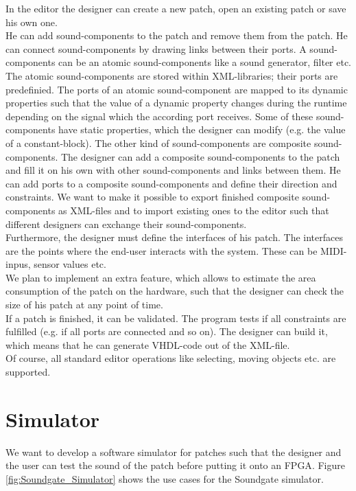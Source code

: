 In the editor the designer can create a new patch, open an existing patch or save his own one. \\
He can add sound-components to the patch and remove them from the patch. He can connect sound-components by drawing links between their ports. A sound-components can be an atomic sound-components like a sound generator, filter etc. The atomic sound-components are stored within XML-libraries; their ports are predefinied. The ports of an atomic sound-component are mapped to its dynamic properties such that the value of a dynamic property changes during the runtime depending on the signal which the according port receives.  Some of these sound-components have static properties, which the designer can modify (e.g. the value of a constant-block). The other kind of sound-components are composite sound-components. The designer can add a composite sound-components to the patch and fill it on his own with other sound-components and links between them. He can add ports to a composite sound-components and define their direction and constraints. We want to make it possible to export finished composite sound-components as XML-files and to import existing ones to the editor such that different designers can exchange their sound-components.\\
Furthermore, the designer must define the interfaces of his patch. The interfaces are the points where the end-user interacts with the system. These can be MIDI-inpus, sensor values etc.\\
We plan to implement an extra feature, which allows to estimate the area consumption of the patch on the hardware, such that the designer can check the size of his patch at any point of time.\\
If a patch is finished, it can be validated. The program tests if all constraints are fulfilled (e.g. if all ports are connected and so on). The designer can build it, which means that he can generate VHDL-code out of the XML-file.\\
Of course, all standard editor operations like selecting, moving objects etc. are supported.

\section{Simulator}

We want to develop a software simulator for patches such that the designer and the user can test the sound of the patch before putting it onto an \ac{FPGA}. Figure \ref{fig:Soundgate_Simulator} shows the use cases for the Soundgate simulator.

